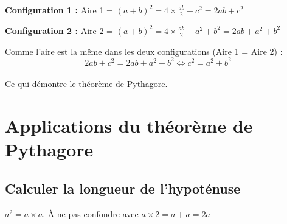 \textbf{Configuration 1 :} Aire 1 = $(a+b)^2 = 4 \times \frac{ab}{2} + c^2 = 2ab + c^2$

\textbf{Configuration 2 :} Aire 2 = $(a+b)^2 = 4 \times \frac{ab}{2} + a^2 + b^2 = 2ab + a^2 + b^2$

Comme l'aire est la même dans les deux configurations (Aire 1 = Aire 2) :
$$2ab + c^2 = 2ab + a^2 + b^2 \Leftrightarrow c^2 = a^2 + b^2$$ \\
Ce qui démontre le théorème de Pythagore.

\section{Applications du théorème de Pythagore}

\subsection{Calculer la longueur de l'hypoténuse}

\begin{remarkbox}[Important]
$a^2 = a\times a$. À ne pas confondre avec $a \times 2 = a + a = 2a$
\end{remarkbox}


